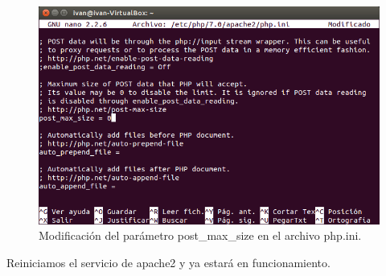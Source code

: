 \begin{itemize}
	\begin{figure}[H]
		\centering
		\includegraphics[width=0.7\linewidth]{phpPostMaxSize}
		\caption[php post max size]{Modificación del parámetro post\_max\_size en el archivo php.ini.}
		\label{fig:phpPostMaxSize}
	\end{figure}
	
	Reiniciamos el servicio de apache2 y ya estará en funcionamiento.
	
\end{itemize}

